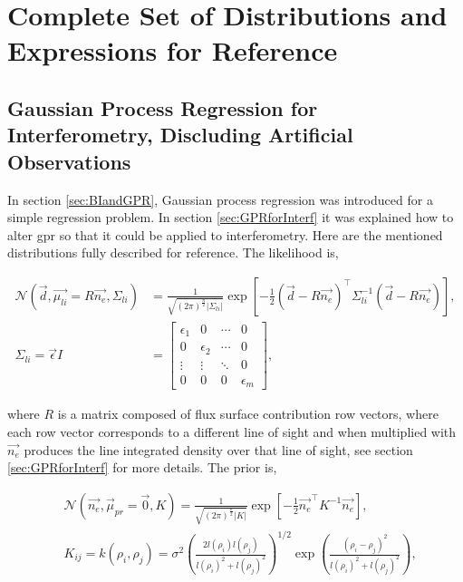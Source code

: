 \chapter{Complete Set of Distributions and Expressions for Reference}
\label{append:distexpres}
\section{Gaussian Process Regression for Interferometry, Discluding Artificial Observations}

In section \ref{sec:BIandGPR}, Gaussian process regression was introduced for a simple regression problem. In section \ref{sec:GPRforInterf} it was explained how to alter \gls{gpr} so that it could be applied to interferometry. Here are the mentioned distributions fully described for reference.  The likelihood is,

\begin{equation}
\begin{aligned}
\mathcal{N}(\vec{d}, \vec{\mu_{li}} = R\vec{n_e}, \Sigma_{li}) &= \frac{1}{\sqrt{(2\pi)^{\frac{n}{2}}|\Sigma_{li}|}} \exp \left[{{-\frac{1}{2}(\vec{d}-R\vec{n_e})^\top\Sigma_{li}^{-1}(\vec{d}-R\vec{n_e})}}\right],\\
\Sigma_{li} = \vec{\epsilon}I &=
\begin{bmatrix}
\epsilon_1 & 0 & \cdots & 0\\
0 & \epsilon_2 & \cdots & 0\\
\vdots & \vdots & \ddots & 0 \\
0 & 0 & 0 &\epsilon_m
\end{bmatrix},
\end{aligned}
\end{equation}
  
\noindent where $R$ is a matrix composed of flux surface contribution row vectors, where each row vector corresponds to a different line of sight and when multiplied with $\vec{n_e}$ produces the line integrated density over that line of sight, see section \ref{sec:GPRforInterf} for more details. The prior is,

\begin{equation}
\begin{aligned}
&\mathcal{N}(\vec{n_e}, \vec \mu_{pr} = \vec{0}, K) = \frac{1}{\sqrt{(2\pi)^{\frac{n}{2}}|K|}} \exp \left[{{-\frac{1}{2}\vec{n_e}^\top K^{-1}\vec{n_e}}}\right],\\
&K_{ij} = k(\rho_i, \rho_j) = \sigma^2 \left( \frac{2l(\rho_i)l(\rho_j)}{l(\rho_i)^2 + l(\rho_j)^2} \right)^{1/2} \exp\left({\frac{(\rho_i - \rho_j)^2}{l(\rho_i)^2+l(\rho_j)^2}}\right),\\
\end{aligned}
\end{equation}


